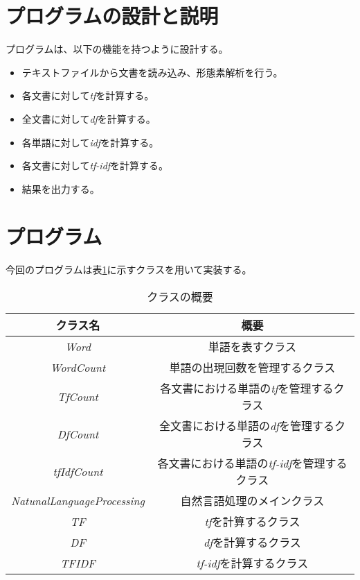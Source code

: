 \documentclass[a4paper,11pt,dvipdfmx]{jsarticle}
\begin{document}
\section{プログラムの設計と説明}
プログラムは、以下の機能を持つように設計する。
\begin{itemize}
  \item テキストファイルから文書を読み込み、形態素解析を行う。
  \item 各文書に対して\textit{tf}を計算する。
  \item 全文書に対して\textit{df}を計算する。
  \item 各単語に対して\textit{idf}を計算する。
  \item 各文書に対して\textit{tf-idf}を計算する。
  \item 結果を出力する。
\end{itemize}

\section{プログラム}
今回のプログラムは表\ref{table:class_overview}に示すクラスを用いて実装する。


\begin{table}[H]
\centering
\caption{クラスの概要}
\label{table:class_overview}
  \begin{tabular}{|c|c|}
    \hline
    クラス名 & 概要 \\
    \hline
    \textit{Word} & 単語を表すクラス \\
    \hline
    \textit{WordCount} & 単語の出現回数を管理するクラス \\
    \hline
    \textit{TfCount} & 各文書における単語の\textit{tf}を管理するクラス \\
    \hline
    \textit{DfCount} & 全文書における単語の\textit{df}を管理するクラス \\
    \hline
    \textit{tfIdfCount} & 各文書における単語の\textit{tf-idf}を管理するクラス \\
    \hline
    \textit{NatunalLanguageProcessing} & 自然言語処理のメインクラス \\
    \hline
    \textit{TF} & \textit{tf}を計算するクラス \\
    \hline
    \textit{DF} & \textit{df}を計算するクラス \\
    \hline
    \textit{TFIDF} & \textit{tf-idf}を計算するクラス \\
    \hline
  \end{tabular}
\end{table}
\end{document}
